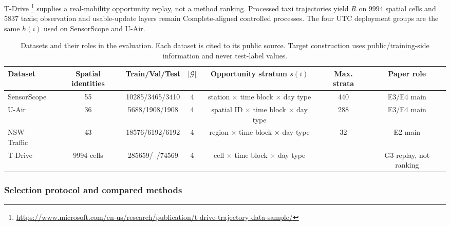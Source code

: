 \documentclass[letterpaper,journal]{IEEEtran}
\begin{document}
T-Drive
\cite{yuan2010tdrive}\footnote{\url{https://www.microsoft.com/en-us/research/publication/t-drive-trajectory-data-sample/}}
supplies a real-mobility opportunity replay, not a
method ranking.  Processed taxi trajectories yield $R$ on $9994$
spatial cells and $5837$ taxis; observation and usable-update layers
remain Complete-aligned controlled processes.  The four UTC deployment
groups are the same $h(i)$ used on SensorScope and U-Air.

\begin{table}[t]
\centering
\caption{Datasets and their roles in the evaluation.  Each dataset is cited to
its public source.  Target construction uses public/training-side information
and never test-label values.}
\label{tab:datasets}
\setlength{\tabcolsep}{4.5pt}
\begin{tabular}{lcccccc}
\toprule
Dataset & Spatial identities & Train/Val/Test & $|\mathcal G|$ &
Opportunity stratum $s(i)$ & Max. strata & Paper role\\
\midrule
SensorScope~\cite{ingelrest2010sensorscope} & 55 & 10285/3465/3410 & 4 &
station $\times$ time block $\times$ day type & 440 & E3/E4 main\\
U-Air~\cite{zheng2013uair} & 36 & 5688/1908/1908 & 4 &
spatial ID $\times$ time block $\times$ day type & 288 & E3/E4 main\\
NSW-Traffic~\cite{tfnsw2024traffic} & 43 & 18576/6192/6192 & 4 &
region $\times$ time block $\times$ day type & 32 & E2 main\\
T-Drive~\cite{yuan2010tdrive} & 9994 cells & 285659/--/74569 & 4 &
cell $\times$ time block $\times$ day type & -- & G3 replay, not ranking\\
\bottomrule
\end{tabular}
\end{table}

\subsubsection{Selection protocol and compared methods}
\end{document}

